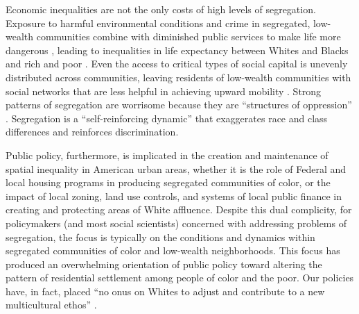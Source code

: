\documentclass[11pt,]{article}
\begin{document}
Economic inequalities are not the only costs of high levels of
segregation. Exposure to harmful environmental conditions and crime in
segregated, low-wealth communities combine with diminished public
services to make life more dangerous \autocite{hs2009hs}, leading to
inequalities in life expectancy between Whites and Blacks and rich and
poor \autocite{jackson2000relation,anderson2010}. Even the access to
critical types of social capital is unevenly distributed across
communities, leaving residents of low-wealth communities with social
networks that are less helpful in achieving upward mobility
\autocite*{briggs1998}. Strong patterns of segregation are worrisome
because they are ``structures of oppression'' \autocite{young2002}.
Segregation is a ``self-reinforcing dynamic''
\autocite{galster1999evolving} that exaggerates race and class
differences and reinforces discrimination.

Public policy, furthermore, is implicated in the creation and
maintenance of spatial inequality in American urban areas, whether it is
the role of Federal and local housing programs in producing segregated
communities of color, or the impact of local zoning, land use controls,
and systems of local public finance in creating and protecting areas of
White affluence. Despite this dual complicity, for policymakers (and
most social scientists) concerned with addressing problems of
segregation, the focus is typically on the conditions and dynamics
within segregated communities of color and low-wealth neighborhoods.
This focus has produced an overwhelming orientation of public policy
toward altering the pattern of residential settlement among people of
color and the poor. Our policies have, in fact, placed ``no onus on
Whites to adjust and contribute to a new multicultural ethos''
\autocite[p.~81]{cashin2004failures}.
\end{document}
